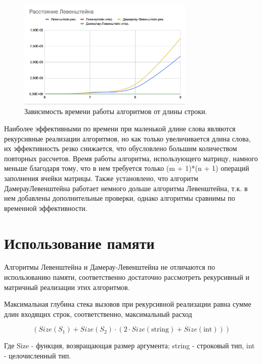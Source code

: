 \documentclass[12pt]{report}
\begin{document}
	\pagebreak
	
	
	\begin{figure}[ht]
		\centering
		\includegraphics[width=0.75\textwidth]{plot.png}
		\caption{Зависимость времени работы алгоритмов от длины строки.}
		\label{fig:mpr}
	\end{figure}

	Наиболее эффективными по времени при маленькой длине слова являются рекурсивные реализации алгоритмов, но как только увеличивается длина слова, их эффективность резко снижается, что обусловлено большим количеством повторных рассчетов. Время работы алгоритма, использующего матрицу, намного меньше благодаря тому, что в нем требуется только (m + 1)*(n + 1) операций заполнения ячейки матрицы. Также установлено, что алгоритм ДамерауЛевенштейна работает немного дольше алгоритма Левенштейна, т.к. в нем добавлены дополнительные проверки, однако алгоритмы сравнимы по временной эффективности.

	\section{Использование памяти}

	\par
	Алгоритмы Левенштейна и Дамерау-Левенштейна не отличаются по использованию памяти, соответственно достаточно рассмотреть рекурсивный и матричный реализации этих алгоритмов.

	\par
	Максимальная глубина стека вызовов при рекурсивной реализации равна сумме длин входящих строк, соответственно, максимальный расход

	\begin{equation}
		(Size(S_{1}) + Size(S_{2}) \cdot (2 \cdot Size(\text{string}) + Size(\text{int})))
	\end{equation}
	
	\par 
	Где Size - функция, возвращающая размер аргумента; string - строковый тип, int - целочисленный тип.
\end{document}
